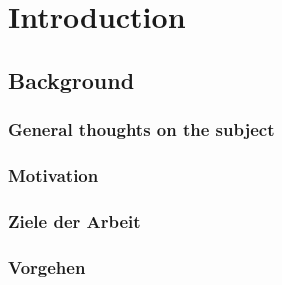 \chapter{Introduction}

\lipsum[3-5]

\section{Background}

\lipsum[3-5]

\subsection{General thoughts on the subject}

\lipsum[3-5]

\subsection{Motivation}

\lipsum[3-5]

\subsection{Ziele der Arbeit}

\lipsum[3-5]

\subsection{Vorgehen}

\lipsum[3-5]
